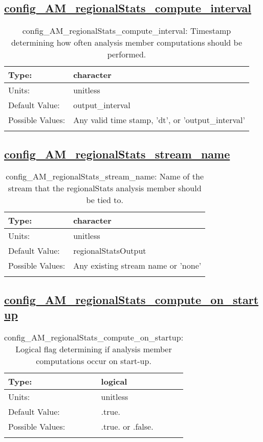 \subsection[config\_AM\_regionalStats\_compute\_interval]{\hyperref[sec:nm_tab_AM_regionalStats]{config\_AM\_regionalStats\_compute\_interval}}
\label{subsec:nm_sec_config_AM_regionalStats_compute_interval}
\begin{center}
\begin{longtable}{| p{2.0in} || p{4.0in} |}
    \hline
    Type: & character \\
    \hline
    Units: & \si{unitless} \\
    \hline
    Default Value: & output\_interval \\
    \hline
    Possible Values: & Any valid time stamp, 'dt', or 'output\_interval' \\
    \hline
    \caption{config\_AM\_regionalStats\_compute\_interval: Timestamp determining how often analysis member computations should be performed.}
\end{longtable}
\end{center}
\subsection[config\_AM\_regionalStats\_stream\_name]{\hyperref[sec:nm_tab_AM_regionalStats]{config\_AM\_regionalStats\_stream\_name}}
\label{subsec:nm_sec_config_AM_regionalStats_stream_name}
\begin{center}
\begin{longtable}{| p{2.0in} || p{4.0in} |}
    \hline
    Type: & character \\
    \hline
    Units: & \si{unitless} \\
    \hline
    Default Value: & regionalStatsOutput \\
    \hline
    Possible Values: & Any existing stream name or 'none' \\
    \hline
    \caption{config\_AM\_regionalStats\_stream\_name: Name of the stream that the regionalStats analysis member should be tied to.}
\end{longtable}
\end{center}
\subsection[config\_AM\_regionalStats\_compute\_on\_startup]{\hyperref[sec:nm_tab_AM_regionalStats]{config\_AM\_regionalStats\_compute\_on\_startup}}
\label{subsec:nm_sec_config_AM_regionalStats_compute_on_startup}
\begin{center}
\begin{longtable}{| p{2.0in} || p{4.0in} |}
    \hline
    Type: & logical \\
    \hline
    Units: & \si{unitless} \\
    \hline
    Default Value: & .true. \\
    \hline
    Possible Values: & .true. or .false. \\
    \hline
    \caption{config\_AM\_regionalStats\_compute\_on\_startup: Logical flag determining if analysis member computations occur on start-up.}
\end{longtable}
\end{center}
